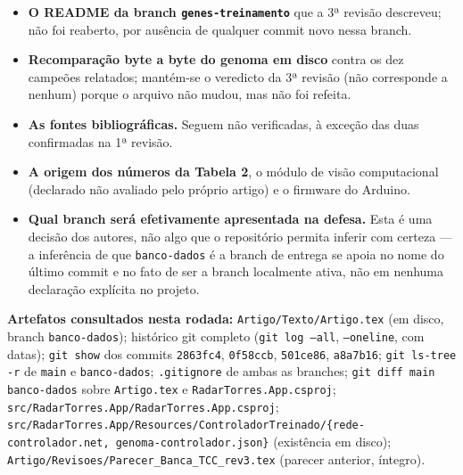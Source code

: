 \documentclass[11pt,a4paper]{article}
\begin{document}
\begin{itemize}
  \item \textbf{O README da branch \texttt{genes-treinamento}} que a 3ª revisão descreveu; não foi
  reaberto, por ausência de qualquer commit novo nessa branch.
  \item \textbf{Recomparação byte a byte do genoma em disco} contra os dez campeões relatados; mantém-se
  o veredicto da 3ª revisão (não corresponde a nenhum) porque o arquivo não mudou, mas não foi refeita.
  \item \textbf{As fontes bibliográficas.} Seguem não verificadas, à exceção das duas confirmadas na
  1ª revisão.
  \item \textbf{A origem dos números da Tabela 2}, o módulo de visão computacional (declarado não
  avaliado pelo próprio artigo) e o firmware do Arduino.
  \item \textbf{Qual branch será efetivamente apresentada na defesa.} Esta é uma decisão dos autores,
  não algo que o repositório permita inferir com certeza --- a inferência de que \texttt{banco-dados}
  é a branch de entrega se apoia no nome do último commit e no fato de ser a branch localmente
  ativa, não em nenhuma declaração explícita no projeto.
\end{itemize}

\textbf{Artefatos consultados nesta rodada:} \texttt{Artigo/Texto/Artigo.tex} (em disco, branch
\texttt{banco-dados}); histórico git completo (\texttt{git log --all}, \texttt{--oneline}, com datas);
\texttt{git show} dos commits \texttt{2863fc4}, \texttt{0f58ccb}, \texttt{501ce86}, \texttt{a8a7b16};
\texttt{git ls-tree -r} de \texttt{main} e \texttt{banco-dados}; \texttt{.gitignore} de ambas as
branches; \texttt{git diff main banco-dados} sobre \texttt{Artigo.tex} e
\texttt{RadarTorres.App.csproj}; \texttt{src/RadarTorres.App/RadarTorres.App.csproj};
\texttt{src/RadarTorres.App/Resources/ControladorTreinado/\{rede-controlador.net,
genoma-controlador.json\}} (existência em disco); \texttt{Artigo/Revisoes/Parecer\_Banca\_TCC\_rev3.tex}
(parecer anterior, íntegro).
\end{document}
